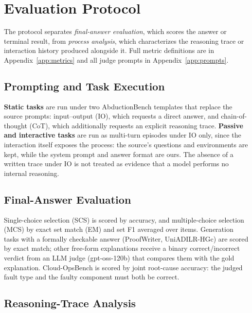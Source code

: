 \section{Evaluation Protocol}
\label{sec:evaluation_protocol}
\label{sec:methodology_evaluation_protocol}

The protocol separates \emph{final-answer evaluation}, which scores the answer or terminal result, from \emph{process analysis}, which characterizes the reasoning trace or interaction history produced alongside it. Full metric definitions are in Appendix~\ref{app:metrics} and all judge prompts in Appendix~\ref{app:prompts}.

\subsection{Prompting and Task Execution}
\label{sec:task_execution}

\textbf{Static tasks} are run under two AbductionBench templates that replace the source prompts: input--output (IO), which requests a direct answer, and chain-of-thought (CoT), which additionally requests an explicit reasoning trace. \textbf{Passive and interactive tasks} are run as multi-turn episodes under IO only, since the interaction itself exposes the process: the source's questions and environments are kept, while the system prompt and answer format are ours. The absence of a written trace under IO is not treated as evidence that a model performs no internal reasoning.

\subsection{Final-Answer Evaluation}
\label{sec:outcome_evaluation}
\label{sec:methodology_metrics}

Single-choice selection (SCS) is scored by accuracy, and multiple-choice selection (MCS) by exact set match (EM) and set F1 averaged over items. Generation tasks with a formally checkable answer (ProofWriter, UniADILR-HGc) are scored by exact match; other free-form explanations receive a binary correct/incorrect verdict from an LLM judge (gpt-oss-120b) that compares them with the gold explanation. Cloud-OpsBench is scored by joint root-cause accuracy: the judged fault type and the faulty component must both be correct.

\subsection{Reasoning-Trace Analysis}
\label{sec:reasoning_trace_evaluation}

